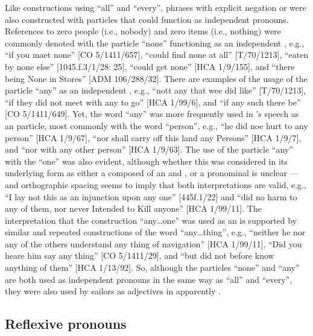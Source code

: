 Like constructions using “all” and “every”, phrases with explicit negation or  were also constructed with  particles that could function as independent pronouns. References to zero people (i.e., nobody) and zero items (i.e., nothing) were commonly denoted with the particle “none” functioning as an independent , e.g., “if you maet none” [CO 5/1411/657], “could find none at all” [T/70/1213], “eaten by none else” [1045.f.3/1/28: 25], “could get none” [HCA 1/9/155], and “there being None in Stores” [ADM 106/288/32]. There are examples of the usage of the particle “any” as an independent , e.g., “nott any that wee did like” [T/70/1213], “if they did not meet with any to go” [HCA 1/99/6], and “if any such there be” [CO 5/1411/649]. Yet, the word “any” was more frequently used in ’s speech as an  particle, most commonly with the word “person”, e.g., “he did noe hurt to any person” [HCA 1/9/67], “nor shall carry off this land any Persons” [HCA 1/9/7], and “nor with any other person” [HCA 1/9/63]. The use of the particle “any” with the  “one” was also evident, although whether this was considered in its underlying form as either a  composed of an  and , or a pronominal  is unclear — and orthographic spacing seems to imply that both interpretations are valid, e.g., “I lay not this as an injunction upon any one” [445f.1/22] and “did no harm to any of them, nor never Intended to Kill anyone” [HCA 1/99/11]. The interpretation that the construction “any…one” was used as an   is supported by similar and repeated constructions of the word “any…thing”, e.g., “neither he nor any of the others understand any thing of navigation” [HCA 1/99/11], “Did you heare him say any thing” [CO 5/1411/29], and “but did not before know anything of them” [HCA 1/13/92]. So, although the particles “none” and “any” are both used as independent pronouns in the same way as “all” and “every”, they were also used by sailors as  adjectives in apparently .

\subsection{{Reflexive pronouns}}\label{sec:5.4.5}

